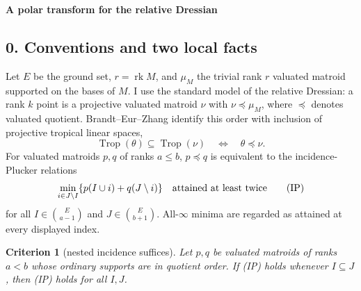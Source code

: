 \documentclass[12pt]{article}
\newcommand{\Trop}{\operatorname{Trop}}
\newcommand{\rk}{\operatorname{rk}}
\newtheorem{criterion}{Criterion}
\begin{document}
\begin{center}
{\bf A polar transform for the relative Dressian}
\end{center}

\subsection*{0. Conventions and two local facts}

Let $E$ be the ground set, $r=\rk M$, and $\mu_M$ the trivial rank $r$
valuated matroid supported on the bases of $M$.  I use the standard
model of the relative Dressian: a rank $k$ point is a projective
valuated matroid $\nu$ with $\nu\preceq\mu_M$, where $\preceq$ denotes
valuated quotient.  Brandt--Eur--Zhang \cite{BEZ} identify this order with
inclusion of projective tropical linear spaces,
\[
        \Trop(\theta)\subseteq\Trop(\nu)
        \quad\Longleftrightarrow\quad \theta\preceq\nu .
\]
For valuated matroids $p,q$ of ranks $a\le b$, $p\preceq q$ is
equivalent to the incidence-Plucker relations
\[
 \min_{i\in J\setminus I}\{p(I\cup i)+q(J\setminus i)\}
 \quad\hbox{attained at least twice}                         \tag{IP}
\]
for all $I\in\binom{E}{a-1}$ and $J\in\binom{E}{b+1}$.  All-$\infty$
minima are regarded as attained at every displayed index.

\begin{criterion}[nested incidence suffices]\label{crit:local}
Let $p,q$ be valuated matroids of ranks $a<b$ whose ordinary supports
are in quotient order.  If {\rm (IP)} holds whenever $I\subseteq J$,
then {\rm (IP)} holds for all $I,J$.
\end{criterion}
\end{document}
